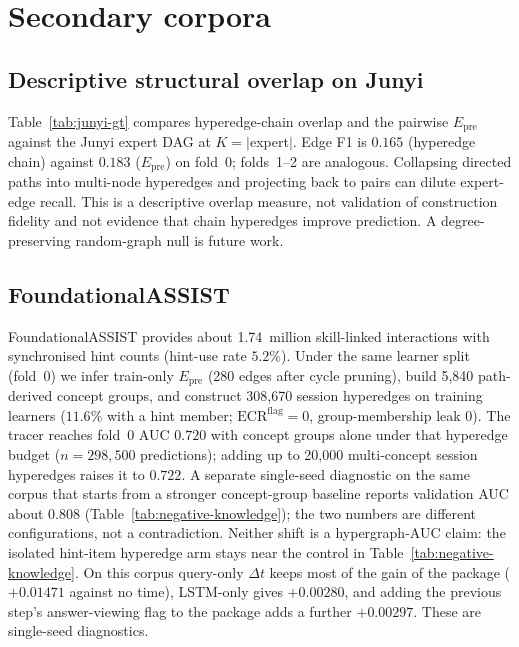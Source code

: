 \documentclass[review,12pt]{elsarticle}
\begin{document}


\FloatBarrier

\section{Secondary corpora}
\subsection{Descriptive structural overlap on Junyi}
\label{app:junyi-gt}
\label{sec:junyi-gt}
Table~\ref{tab:junyi-gt} compares hyperedge-chain overlap and the
pairwise $E_{\mathrm{pre}}$ against the Junyi expert DAG at
$K{=}|$expert$|$. Edge F1 is $0.165$ (hyperedge chain) against $0.183$
($E_{\mathrm{pre}}$) on fold~0; folds~1--2 are analogous. Collapsing
directed paths into multi-node hyperedges and projecting back to pairs
can dilute expert-edge recall. This is a descriptive overlap measure,
not validation of construction fidelity and not evidence that chain
hyperedges improve prediction. A degree-preserving random-graph null is
future work.



\subsection{FoundationalASSIST}
\label{app:foundational-assist}
\label{sec:foundational-assist}
FoundationalASSIST \cite{foundationalassist2026} provides about
1.74~million skill-linked interactions with synchronised hint counts
(hint-use rate $5.2\%$). Under the same learner split (fold~0) we infer
train-only $E_{\mathrm{pre}}$ (280 edges after cycle pruning), build
5{,}840 path-derived concept groups, and construct 308{,}670 session
hyperedges on training learners ($11.6\%$ with a hint member;
$\mathrm{ECR}^{\mathrm{flag}}{=}0$, group-membership leak $0$). The
tracer reaches fold~0 AUC $0.720$ with concept groups alone under that
hyperedge budget ($n{=}298{,}500$ predictions); adding up to 20{,}000
multi-concept session hyperedges raises it to $0.722$. A separate
single-seed diagnostic on the same corpus that starts from a stronger
concept-group baseline reports validation AUC about $0.808$
(Table~\ref{tab:negative-knowledge}); the two numbers are different
configurations, not a contradiction. Neither shift is a hypergraph-AUC
claim: the isolated hint-item hyperedge arm stays near the control in
Table~\ref{tab:negative-knowledge}. On this corpus query-only
$\Delta t$ keeps most of the gain of the package ($+0.01471$ against no
time), LSTM-only gives $+0.00280$, and adding the previous step's
answer-viewing flag to the package adds a further $+0.00297$. These are
single-seed diagnostics.


\FloatBarrier



\end{document}
